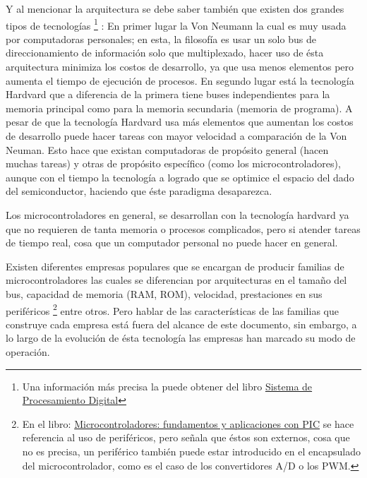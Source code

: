 \documentclass{article}
\begin{document}
Y al mencionar la arquitectura se debe saber también que existen dos
grandes tipos de tecnologías \footnote{Una información más precisa la puede
		obtener del libro \href{https://books.google.com.co/books?id=N7u2x4LyJ7UC\&pg=PA8\&dq=harvard+von+neumann\&hl=es-419\&sa=X\&ved=0ahUKEwjCrOKkus_LAhVCQSYKHVBGB8gQ6AEIHTAA\#v=onepage\&q=harvard\%20von\%20neumann\&f=false}{Sistema de Procesamiento Digital}} 
: En primer lugar la Von Neumann la cual es muy
usada por computadoras personales; en esta, la filosofía es usar un solo bus
de direccionamiento de información solo que multiplexado, hacer uso de ésta
arquitectura minimiza los costos de desarrollo, ya que usa menos elementos
pero aumenta el tiempo de ejecución de procesos. En segundo lugar está
la tecnología Hardvard que a diferencia de la primera tiene buses 
independientes para la memoria principal como para la memoria secundaria
(memoria de programa). A pesar de que la tecnología Hardvard usa más
elementos que aumentan los costos de desarrollo puede hacer tareas con
mayor velocidad a comparación de la Von Neuman. Esto hace que existan
computadoras de propósito general (hacen muchas tareas) y otras de
propósito específico (como los microcontroladores), aunque con el tiempo la
tecnología a logrado que se optimice el espacio del dado del semiconductor,
haciendo que éste paradigma desaparezca.

Los microcontroladores en general, se desarrollan con la tecnología hardvard
ya que no requieren de tanta memoria o procesos complicados, pero si atender
tareas de tiempo real, cosa que un computador personal no puede hacer en
general.

Existen diferentes empresas populares que se encargan de producir 
familias de microcontroladores las cuales se diferencian por arquitecturas
en el tamaño del bus, capacidad de memoria (RAM, ROM), velocidad, 
prestaciones en sus periféricos \footnote{En el libro: 
		\href{https://books.google.com.co/books?id=ODenKGOHMRkC\&pg=PA149i\&dq=perifericoi\&hl=es-419\&sa=X\&redir_esc=y\#v=onepage\&q=peroperiferico\&f=false}
{Microcontroladores: fundamentos y aplicaciones con PIC} se hace referencia
al uso de periféricos, pero señala que éstos son externos, cosa que no es 
precisa, un periférico también puede estar introducido en el encapsulado 
del microcontrolador, como es el caso
de los convertidores A/D o los PWM.} entre otros. Pero hablar de las
características de las familias que construye cada empresa está fuera
del alcance de este documento, sin embargo, a lo largo de la evolución de
ésta tecnología las empresas han marcado su modo de operación.
\end{document}
